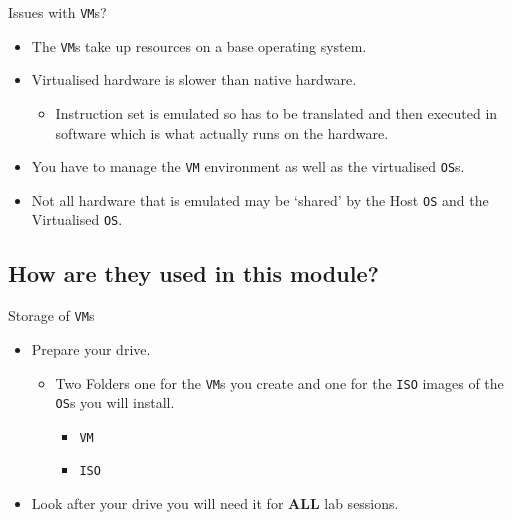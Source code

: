 \documentclass{beamer}
\begin{document}
\begin{frame}{Issues with \texttt{VM}s?}
  \begin{itemize}
    \item The \texttt{VM}s take up resources on a base operating system.
    \item Virtualised hardware is slower than native hardware.
      \begin{itemize}
        \item Instruction set is emulated so has to be translated and then executed in software which is what actually runs on the hardware.
      \end{itemize}
    \item You have to manage the \texttt{VM} environment as well as the virtualised \texttt{OS}s.
    \item Not all hardware that is emulated may be `shared' by the Host \texttt{OS} and the Virtualised \texttt{OS}.  
  \end{itemize}
\end{frame}

\subsection{How are they used in this module?}
\begin{frame}{Storage of \texttt{VM}s}
  \begin{itemize}
    \item Prepare your drive.
      \begin{itemize}
        \item Two Folders one for the \texttt{VM}s you create and one for the \texttt{ISO} images of the \texttt{OS}s you will install.
        \begin{itemize}
          \item \texttt{VM}
          \item \texttt{ISO}
        \end{itemize}  
      \end{itemize}
    \item Look after your drive you will need it for \textbf{ALL} lab sessions.
  \end{itemize}
\end{frame}
\end{document}
